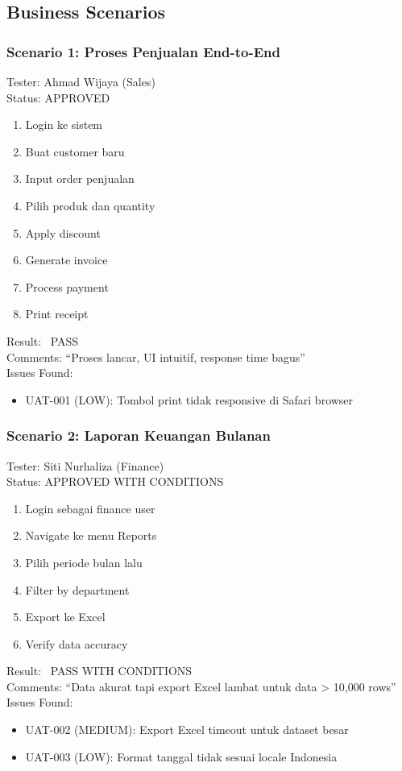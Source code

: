 \documentclass[12pt,a4paper]{article}
\newcommand{\cmark}{\ding{51}}
\newcommand{\warn}{\ding{115}}
\begin{document}
\subsection{Business Scenarios}
\subsubsection{Scenario 1: Proses Penjualan End-to-End}
Tester: Ahmad Wijaya (Sales) \\
Status: APPROVED
\begin{enumerate}
  \item Login ke sistem
  \item Buat customer baru
  \item Input order penjualan
  \item Pilih produk dan quantity
  \item Apply discount
  \item Generate invoice
  \item Process payment
  \item Print receipt
\end{enumerate}
Result: \cmark\ PASS \\
Comments: ``Proses lancar, UI intuitif, response time bagus'' \\
Issues Found:
\begin{itemize}
  \item UAT-001 (LOW): Tombol print tidak responsive di Safari browser
\end{itemize}

\subsubsection{Scenario 2: Laporan Keuangan Bulanan}
Tester: Siti Nurhaliza (Finance) \\
Status: APPROVED WITH CONDITIONS
\begin{enumerate}
  \item Login sebagai finance user
  \item Navigate ke menu Reports
  \item Pilih periode bulan lalu
  \item Filter by department
  \item Export ke Excel
  \item Verify data accuracy
\end{enumerate}
Result: \warn\ PASS WITH CONDITIONS \\
Comments: ``Data akurat tapi export Excel lambat untuk data > 10{,}000 rows'' \\
Issues Found:
\begin{itemize}
  \item UAT-002 (MEDIUM): Export Excel timeout untuk dataset besar
  \item UAT-003 (LOW): Format tanggal tidak sesuai locale Indonesia
\end{itemize}
\end{document}
